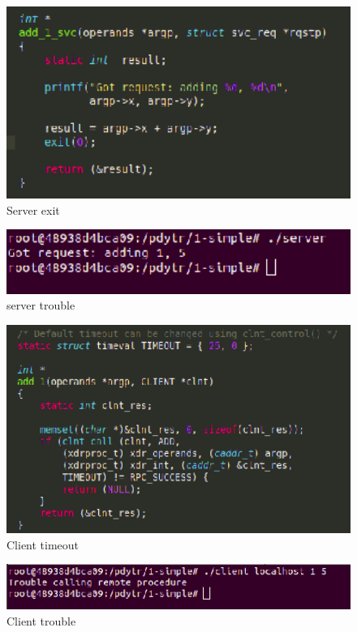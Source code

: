 \documentclass[12pt,journal,compsoc]{IEEEtran}
\begin{document}
\begin{figure}[H]
\centering
\includegraphics[width=125mm]{capturas/exit-to-server.png}
\caption{Server exit}
\label{fig:exit-to-server}
\end{figure}

\begin{figure}[H]
\centering
\includegraphics[width=125mm]{capturas/server-trouble.png}
\caption{server trouble}
\label{fig:server-trouble}
\end{figure}

\begin{figure}[H]
\centering
\includegraphics[width=125mm]{capturas/client-timeout.png}
\caption{Client timeout}
\label{fig:client-timeout}
\end{figure}

\begin{figure}[H]
\centering
\includegraphics[width=125mm]{capturas/client-trouble.png}
\caption{Client trouble}
\label{fig:client-trouble}
\end{figure}
\end{document}
